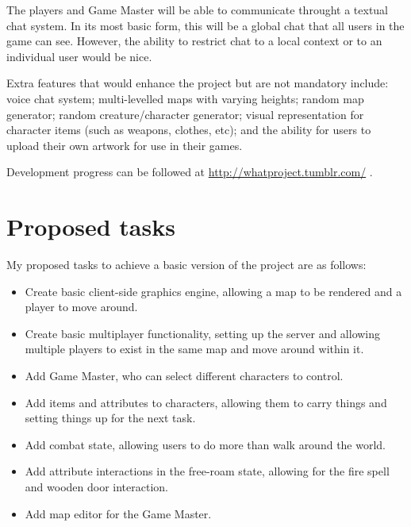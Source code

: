 \documentclass[11pt,fleqn,twoside]{article}
\begin{document}
The players and Game Master will be able to communicate throught a textual chat system. In its most basic form, this will be a global chat that all users in the game can see. However, the ability to restrict chat to a local context or to an individual user would be nice.

Extra features that would enhance the project but are not mandatory include: voice chat system; multi-levelled maps with varying heights; random map generator; random creature/character generator; visual representation for character items (such as weapons, clothes, etc); and the ability for users to upload their own artwork for use in their games.

Development progress can be followed at \url{http://whatproject.tumblr.com/} .

\section{Proposed tasks}
My proposed tasks to achieve a basic version of the project are as follows:

\begin{itemize}
	\item{Create basic client-side graphics engine, allowing a map to be rendered and a player to move around.}
	\item{Create basic multiplayer functionality, setting up the server and allowing multiple players to exist in the same map and move around within it.}
	\item{Add Game Master, who can select different characters to control.}
	\item{Add items and attributes to characters, allowing them to carry things and setting things up for the next task.}
	\item{Add combat state, allowing users to do more than walk around the world.}
	\item{Add attribute interactions in the free-roam state, allowing for the fire spell and wooden door interaction.}
	\item{Add map editor for the Game Master.}
\end{itemize}

\end{document}

